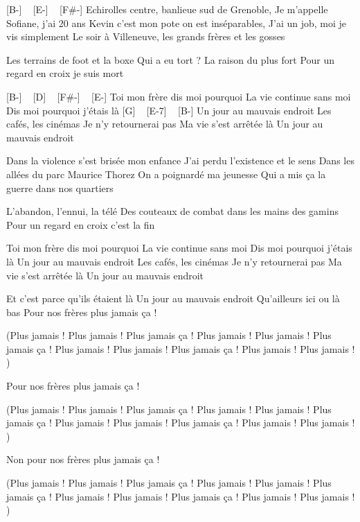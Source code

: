 [B-] ~ [E-] ~ [F#-]
Echirolles centre, banlieue sud de Grenoble,
Je m'appelle Sofiane, j'ai 20 ans
Kevin c'est mon pote on est inséparables,
J'ai un job, moi je vis simplement
Le soir à Villeneuve, les grands frères et les gosses

Les terrains de foot et la boxe
Qui a eu tort ? La raison du plus fort
Pour un regard en croix je suis mort

[B-] ~ [D] ~ [F#-] ~ [E-]
Toi mon frère dis moi pourquoi
La vie continue sans moi
Dis moi pourquoi j'étais là
[G] ~ [E-7] ~ [B-]
Un jour au mauvais endroit
Les cafés, les cinémas
Je n'y retournerai pas
Ma vie s'est arrêtée là
Un jour au mauvais endroit

Dans la violence s'est brisée mon enfance
J'ai perdu l'existence et le sens
Dans les allées du parc Maurice Thorez
On a poignardé ma jeunesse
Qui a mis ça la guerre dans nos quartiers

L'abandon, l'ennui, la télé
Des couteaux de combat dans les mains des gamins
Pour un regard en croix c'est la fin

Toi mon frère dis moi pourquoi
La vie continue sans moi
Dis moi pourquoi j'étais là
Un jour au mauvais endroit
Les cafés, les cinémas
Je n'y retournerai pas
Ma vie s'est arrêtée là
Un jour au mauvais endroit

Et c'est parce qu’ils étaient là
Un jour au mauvais endroit
Qu'ailleurs ici ou là bas
Pour nos frères plus jamais ça !


(Plus jamais ! Plus jamais ! Plus jamais ça !
Plus jamais ! Plus jamais ! Plus jamais ça !
Plus jamais ! Plus jamais ! Plus jamais ça !
Plus jamais ! Plus jamais ! )

Pour nos frères plus jamais ça !

(Plus jamais ! Plus jamais ! Plus jamais ça !
Plus jamais ! Plus jamais ! Plus jamais ça !
Plus jamais ! Plus jamais ! Plus jamais ça !
Plus jamais ! Plus jamais ! )

Non pour nos frères plus jamais ça !

(Plus jamais ! Plus jamais ! Plus jamais ça !
Plus jamais ! Plus jamais ! Plus jamais ça !
Plus jamais ! Plus jamais ! Plus jamais ça !
Plus jamais ! Plus jamais ! ) 